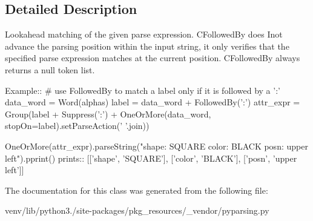 \subsection{Detailed Description}
\begin{DoxyVerb}Lookahead matching of the given parse expression.  C{FollowedBy}
does I{not} advance the parsing position within the input string, it only
verifies that the specified parse expression matches at the current
position.  C{FollowedBy} always returns a null token list.

Example::
    # use FollowedBy to match a label only if it is followed by a ':'
    data_word = Word(alphas)
    label = data_word + FollowedBy(':')
    attr_expr = Group(label + Suppress(':') + OneOrMore(data_word, stopOn=label).setParseAction(' '.join))
    
    OneOrMore(attr_expr).parseString("shape: SQUARE color: BLACK posn: upper left").pprint()
prints::
    [['shape', 'SQUARE'], ['color', 'BLACK'], ['posn', 'upper left']]
\end{DoxyVerb}
 

The documentation for this class was generated from the following file\+:\begin{DoxyCompactItemize}
\item 
venv/lib/python3./site-\/packages/pkg\+\_\+resources/\+\_\+vendor/pyparsing.\+py\end{DoxyCompactItemize}
